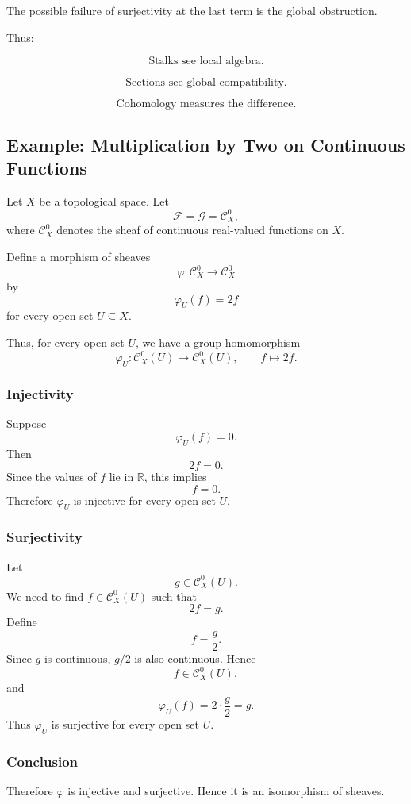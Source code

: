 \documentclass[12pt,a4paper]{article}
\newcommand{\F}{\mathcal F}
\newcommand{\RR}{\mathbb{R}}
\newcommand{\G}{\mathcal G}
\newcommand{\Czero}{\mathcal C^0}        %
\theoremstyle{notespace}
\begin{document}
The possible failure of surjectivity at the last term is the global obstruction.

Thus:

\[
\boxed{
	\text{Stalks see local algebra.}
}
\]

\[
\boxed{
	\text{Sections see global compatibility.}
}
\]

\[
\boxed{
	\text{Cohomology measures the difference.}
}
\]


\subsection{Example: Multiplication by Two on Continuous Functions}

Let \(X\) be a topological space. Let
\[
\F=\G=\Czero_X,
\]
where \(\Czero_X\) denotes the sheaf of continuous real-valued functions on \(X\).

Define a morphism of sheaves
\[
\varphi:\Czero_X\to \Czero_X
\]
by
\[
\varphi_U(f)=2f
\]
for every open set \(U\subseteq X\).

Thus, for every open set \(U\), we have a group homomorphism
\[
\varphi_U:\Czero_X(U)\to \Czero_X(U),
\qquad
f\mapsto 2f.
\]

\subsubsection*{Injectivity}

Suppose
\[
\varphi_U(f)=0.
\]
Then
\[
2f=0.
\]
Since the values of \(f\) lie in \(\RR\), this implies
\[
f=0.
\]
Therefore \(\varphi_U\) is injective for every open set \(U\).

\subsubsection*{Surjectivity}

Let
\[
g\in \Czero_X(U).
\]
We need to find \(f\in \Czero_X(U)\) such that
\[
2f=g.
\]
Define
\[
f=\frac{g}{2}.
\]
Since \(g\) is continuous, \(g/2\) is also continuous. Hence
\[
f\in \Czero_X(U),
\]
and
\[
\varphi_U(f)=2\cdot \frac{g}{2}=g.
\]
Thus \(\varphi_U\) is surjective for every open set \(U\).

\subsubsection*{Conclusion}

Therefore \(\varphi\) is injective and surjective. Hence it is an isomorphism of sheaves.
\end{document}
